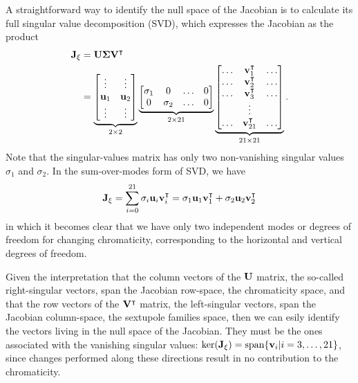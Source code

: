 A straightforward way to identify the null space of the Jacobian is to calculate its full singular value decomposition (SVD), which expresses the Jacobian as the product
\begin{equation}
    \begin{aligned}
        \vb{J}_\xi &= \vb{U}\boldsymbol{\Sigma}\vb{V}^\intercal\\
                   &= \underbrace{\mqty[\vdots & \vdots \\
                            \vb{u}_1 & \vb{u}_2\\
                            \vdots & \vdots]}_{2\times 2}
                            \underbrace{\mqty[\sigma_1 & 0 & \dots & 0\\
                                             0 & \sigma_2 & \dots & 0 ]}_{2\times21}
                            \underbrace{\mqty[
                                \dots & \vb{v}^\intercal_1 & \dots\\
                                \dots & \vb{v}^\intercal_2 & \dots\\
                                \dots & \vb{v}^\intercal_3 & \dots\\
                                      & \vdots &    \\
                                \dots & \vb{v}^\intercal_{21} & \dots\\                              ]}_{21\times21}.
    \end{aligned}
\end{equation}
Note that the singular-values matrix has only two non-vanishing singular values $\sigma_1$ and $\sigma_2$. In the sum-over-modes form of SVD, we have
\begin{equation}
    \vb{J}_\xi = \sum_{i=0}^{21}\sigma_i\vb{u}_i\vb{v}_{i}^{\intercal} = \sigma_1 \vb{u}_1\vb{v}_{1}^\intercal + \sigma_2 \vb{u}_2\vb{v}_{2}^\intercal
\end{equation}
in which it becomes clear that we have only two independent modes or degrees of freedom for changing chromaticity, corresponding to the horizontal and vertical degrees of freedom.

Given the interpretation that the column vectors of the $\vb{U}$ matrix, the so-called right-singular vectors, span the Jacobian row-space, the chromaticity space, and that the row vectors of the $\vb{V}^\intercal$ matrix, the left-singular vectors, span the Jacobian column-space, the sextupole families space, then we can esily identify the vectors living in the null space of the Jacobian. They must be the ones associated with the vanishing singular values: $\text{ker}(\vb{J}_\xi) = \text{span}\{\vb{v}_i|i=3,\dots,21\}$, since changes performed along these directions result in no contribution to the chromaticity.

